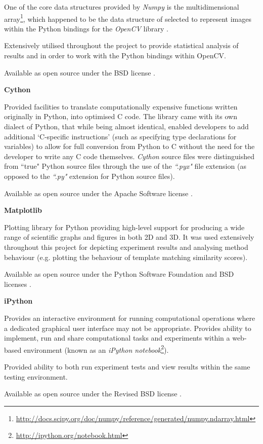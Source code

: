 One of the core data structures provided by \textit{Numpy} is the multidimensional array\footnote{\url{http://docs.scipy.org/doc/numpy/reference/generated/numpy.ndarray.html}}, which happened to be the data structure of selected to represent images within the Python bindings for the \textit{OpenCV} library \cite{opencv}.

Extensively utilised throughout the project to provide statistical analysis of results and in order to work with the Python bindings within OpenCV.
 
Available as open source under the BSD license \cite{numpy-lic}.

\textbf{Cython} \cite{cython} 

Provided facilities to translate computationally expensive functions written originally in Python, into optimised C code. The library came with its own dialect of Python, that while being almost identical, enabled developers to add additional `C-specific instructions' (such as specifying type declarations for variables) to allow for full conversion from Python to C without the need for the developer to write any C code themselves. \textit{Cython} source files were distinguished from ``true" Python source files through the use of the \textit{``.pyx"} file extension (as opposed to the \textit{``.py"} extension for Python source files).

Available as open source under the Apache Software license \cite{cython-lic}.

\textbf{Matplotlib} \cite{matplotlib}

Plotting library for Python providing high-level support for producing a wide range of scientific graphs and figures in both 2D and 3D. It was used extensively throughout this project for depicting experiment results and analysing method behaviour (e.g. plotting the behaviour of template matching similarity scores).

Available as open source under the Python Software Foundation and BSD licenses \cite{matplotlib-lic}.

\textbf{iPython} \cite{ipython} 

Provides an interactive environment for running computational operations where a dedicated graphical user interface may not be appropriate. Provides ability to implement, run and share computational tasks and experiments within a web-based environment (known as an \textit{iPython notebook}\footnote{\url{http://ipython.org/notebook.html}}). 

Provided ability to both run experiment tests and view results within the same testing environment. 

Available as open source under the Revised BSD license \cite{ipython-lic}.
